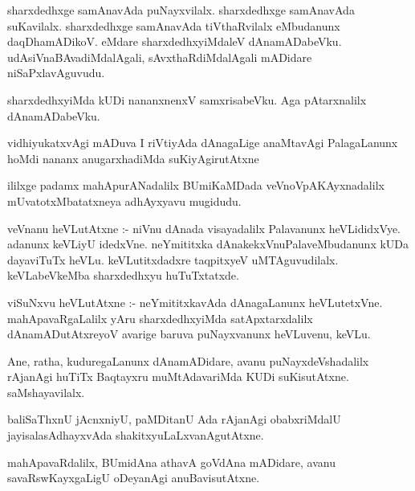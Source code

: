 \documentclass{article}
\begin{document}
\begin{mn}
sharxdedhxge samAnavAda puNayxvilalx.  sharxdedhxge samAnavAda suKavilalx. sharxdedhxge 
samAnavAda tiVthaRvilalx eMbudanunx  daqDhamADikoV.  eMdare sharxdedhxyiMdaleV  
dAnamADabeVku.  udAsiVnaBAvadiMdalAgali,  sAvxthaRdiMdalAgali  mADidare niSaPxlavAguvudu.
\end{mn}

\begin{mn}
sharxdedhxyiMda  kUDi nananxnenxV  samxrisabeVku.  Aga pAtarxnalilx dAnamADabeVku.
\end{mn}

\begin{mn}
vidhiyukatxvAgi mADuva I riVtiyAda dAnagaLige anaMtavAgi PalagaLanunx  hoMdi 
nananx anugarxhadiMda suKiyAgirutAtxne
\end{mn}

\begin{mn}
ililxge padamx mahApurANadalilx BUmiKaMDada veVnoVpAKAyxnadalilx mUvatotxMbatatxneya adhAyxyavu mugidudu.
\end{mn}




\begin{mn}
veVnanu heVLutAtxne :- niVnu dAnada visayadalilx Palavanunx heVLididxVye.  adanunx 
keVLiyU idedxVne.  neYmititxka dAnakekxVnuPalaveMbudanunx kUDa dayaviTuTx heVLu.  
keVLutitxdadxre  taqpitxyeV  uMTAguvudilalx.  keVLabeVkeMba sharxdedhxyu huTuTxtatxde.
\end{mn}

\begin{mn}
viSuNxvu heVLutAtxne :- neYmititxkavAda dAnagaLanunx heVLutetxVne.  mahApavaRgaLalilx  yAru  
sharxdedhxyiMda  satApxtarxdalilx dAnamADutAtxreyoV  avarige baruva puNayxvanunx heVLuvenu,  keVLu.
\end{mn}

\begin{mn}
Ane, ratha, kuduregaLanunx dAnamADidare,  avanu puNayxdeVshadalilx rAjanAgi huTiTx 
Baqtayxru muMtAdavariMda KUDi suKisutAtxne.  saMshayavilalx.
\end{mn}

\begin{mn}
baliSaThxnU  jAcnxniyU, paMDitanU  Ada rAjanAgi obabxriMdalU jayisalasAdhayxvAda shakitxyuLaLxvanAgutAtxne.
\end{mn}

\begin{mn}
mahApavaRdalilx, BUmidAna  athavA  goVdAna  mADidare,  avanu savaRswKayxgaLigU  oDeyanAgi anuBavisutAtxne.
\end{mn}
\end{document}
